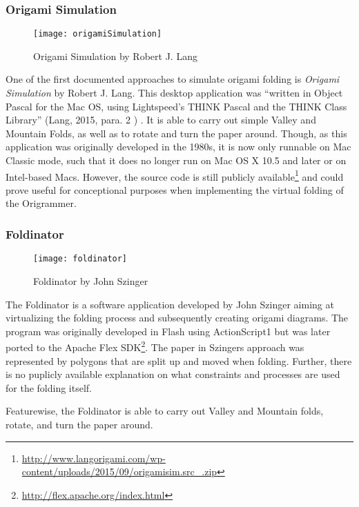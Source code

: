 \subsubsection{Origami Simulation}
\begin{figure}[htbp]
	\centering
	\texttt{[image: origamiSimulation]}
	\caption{Origami Simulation by Robert J. Lang}
	\label{fig:origamiSimulation}
\end{figure}
\noindent One of the first documented approaches to simulate origami folding is \emph{Origami Simulation} \cite{origamiSimulation} by Robert J. Lang. This desktop application was ``written in Object Pascal for the Mac OS, using Lightspeed's THINK Pascal and the THINK Class Library'' (Lang, 2015, para. 2 \cite{origamiSimulation}) . It is able to carry out simple Valley and Mountain Folds, as well as to rotate and turn the paper around.
Though, as this application was originally developed in the 1980s, it is now only runnable on Mac Classic mode, such that it does no longer run on Mac OS X 10.5 and later or on Intel-based Macs. However, the source code is still publicly available\footnote{\url{http://www.langorigami.com/wp-content/uploads/2015/09/origamisim.src_.zip}} and could prove useful for conceptional purposes when implementing the virtual folding of the Origrammer.

\subsubsection{Foldinator}
 \begin{figure}[htbp]
	\centering
	\texttt{[image: foldinator]}
	\caption{Foldinator by John Szinger}
	\label{fig:foldinator}
\end{figure}

\noindent The Foldinator \cite{foldinator} is a software application developed by John Szinger aiming at virtualizing the folding process and subsequently creating origami diagrams.
The program was originally developed in Flash using ActionScript1 but was later ported to the Apache Flex SDK\footnote{\url{http://flex.apache.org/index.html}}. The paper in Szingers approach was represented by polygons that are split up and moved when folding. Further, there is no puplicly available explanation on what constraints and processes are used for the folding itself.

Featurewise, the Foldinator is able to carry out Valley and Mountain folds, rotate, and turn the paper around.

